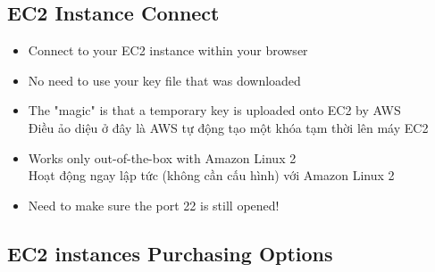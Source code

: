 \subsection{EC2 Instance Connect}

\begin{itemize}
	\item Connect to your EC2 instance within your browser
	\item No need to use your key file that was downloaded
	\item The "magic" is that a temporary key is uploaded onto EC2 by AWS \\ Điều ảo diệu ở đây là AWS tự động tạo một khóa tạm thời lên máy EC2
	\item Works only out-of-the-box with Amazon Linux 2 \\ Hoạt động  ngay lập tức (không cần cấu hình) với Amazon Linux 2
	\item Need to make sure the port 22 is still opened!
\end{itemize}


\subsection{EC2 instances Purchasing Options}


